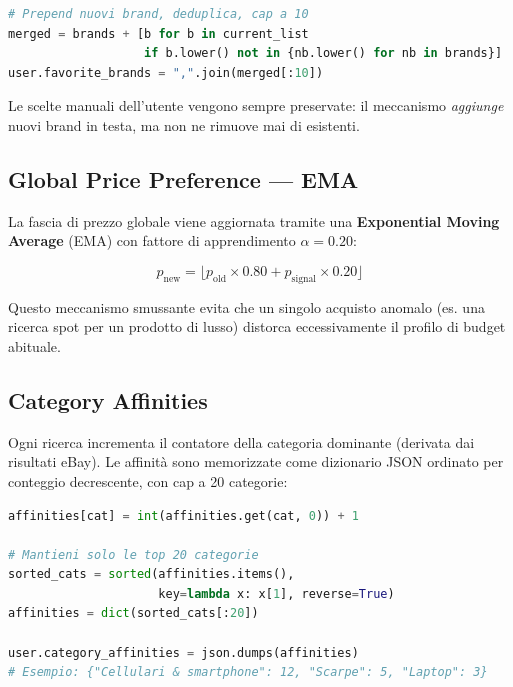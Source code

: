 \begin{lstlisting}[language=Python,caption={Aggiornamento brand preference (app/services/user\_profiling.py)},label=lst:brand-update]
# Prepend nuovi brand, deduplica, cap a 10
merged = brands + [b for b in current_list
                   if b.lower() not in {nb.lower() for nb in brands}]
user.favorite_brands = ",".join(merged[:10])
\end{lstlisting}

Le scelte manuali dell'utente vengono sempre preservate: il meccanismo
\emph{aggiunge} nuovi brand in testa, ma non ne rimuove mai di esistenti.

\subsection{Global Price Preference — EMA}
\label{subsec:price-ema}

La fascia di prezzo globale viene aggiornata tramite una
\textbf{Exponential Moving Average} (EMA) con fattore di apprendimento
$\alpha = 0.20$:

\begin{equation}
    p_{\text{new}} = \lfloor p_{\text{old}} \times 0.80 + p_{\text{signal}} \times 0.20 \rfloor
    \label{eq:ema-price}
\end{equation}

Questo meccanismo smussante evita che un singolo acquisto anomalo (es.
una ricerca spot per un prodotto di lusso) distorca eccessivamente il
profilo di budget abituale.

\subsection{Category Affinities}
\label{subsec:category-affinities}

Ogni ricerca incrementa il contatore della categoria dominante
(derivata dai risultati eBay). Le affinità sono memorizzate come
dizionario JSON ordinato per conteggio decrescente, con cap a 20
categorie:

\begin{lstlisting}[language=Python,caption={Aggiornamento category affinities (app/services/user\_profiling.py)},label=lst:cat-affinities]
affinities[cat] = int(affinities.get(cat, 0)) + 1

# Mantieni solo le top 20 categorie
sorted_cats = sorted(affinities.items(),
                     key=lambda x: x[1], reverse=True)
affinities = dict(sorted_cats[:20])

user.category_affinities = json.dumps(affinities)
# Esempio: {"Cellulari & smartphone": 12, "Scarpe": 5, "Laptop": 3}
\end{lstlisting}

